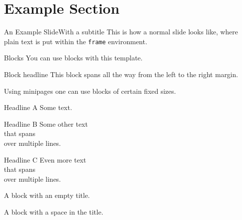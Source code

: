\documentclass[final]{beamer}
\begin{document}
\section{Example Section}
\begin{frame}[t]{An Example Slide}{With a subtitle}
This is how a normal slide looks like, where plain text is put within the \texttt{frame} environment.
\end{frame}
%
%
%
%
%
\begin{frame}[t]{Blocks}{}
You can use blocks with this template.
\begin{block}{Block headline}
This block spans all the way from the left to the right margin.
\end{block}
Using minipages one can use blocks of certain fixed sizes.\\
%
\noindent%
\begin{minipage}[t]{0.45\textwidth}
\begin{block}{Headline A}
Some text.
\end{block}
\end{minipage}
\hfill%
\begin{minipage}[t]{0.2\textwidth}
\begin{block}{Headline B}
Some other text\\
that spans\\
over multiple lines.
\end{block}
\end{minipage}
\hfill%
\begin{minipage}[t]{0.2\textwidth}
\begin{block}{Headline C}
Even more text\\
that spans\\
over multiple lines.
\end{block}
\end{minipage}

\begin{block}{}
A block with an empty title.
\end{block}

\begin{block}{ }
A block with a space in the title.
\end{block}
\end{frame}
%
%
%
%
%
\end{document}
